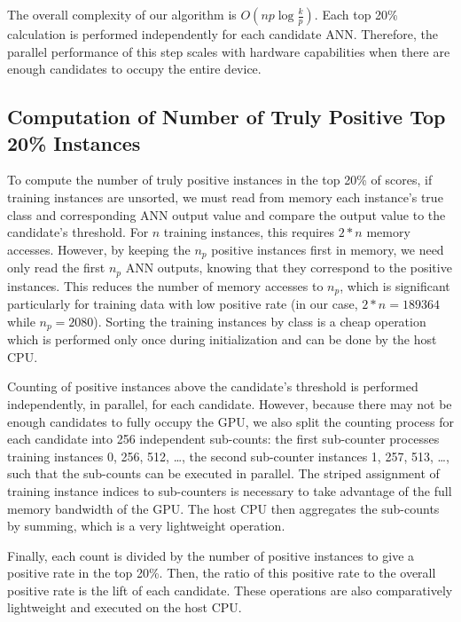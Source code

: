 \documentclass[11pt]{article}       %
\begin{document}
The overall complexity of our algorithm is $O(np \log \frac{k}{p})$. Each top 20\% calculation is performed independently for each candidate ANN. Therefore, the parallel performance of this step scales with hardware capabilities when there are enough candidates to occupy the entire device.

\subsection{Computation of Number of Truly Positive Top 20\% Instances} \label{truepos}
To compute the number of truly positive instances in the top 20\% of scores, if training instances are unsorted, we must read from memory each instance's true class and corresponding ANN output value and compare the output value to the candidate's threshold. For $n$ training instances, this requires $2 * n$ memory accesses. However, by keeping the $n_p$ positive instances first in memory, we need only read the first $n_p$ ANN outputs, knowing that they correspond to the positive instances. This reduces the number of memory accesses to $n_p$, which is significant particularly for training data with low positive rate (in our case, $2 * n = 189364$ while $n_p = 2080$). Sorting the training instances by class is a cheap operation which is performed only once during initialization and can be done by the host CPU.

Counting of positive instances above the candidate's threshold is performed independently, in parallel, for each candidate. However, because there may not be enough candidates to fully occupy the GPU, we also split the counting process for each candidate into 256 independent sub-counts: the first sub-counter processes training instances 0, 256, 512, \ldots, the second sub-counter instances 1, 257, 513, \ldots, such that the sub-counts can be executed in parallel. The striped assignment of training instance indices to sub-counters is necessary to take advantage of the full memory bandwidth of the GPU. The host CPU then aggregates the sub-counts by summing, which is a very lightweight operation.

Finally, each count is divided by the number of positive instances to give a positive rate in the top 20\%. Then, the ratio of this positive rate to the overall positive rate is the lift of each candidate. These operations are also comparatively lightweight and executed on the host CPU.
\end{document}
